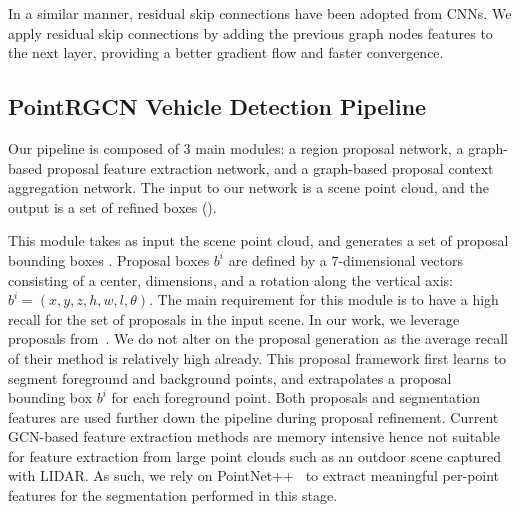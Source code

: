 \documentclass[10pt,twocolumn,letterpaper]{article}
\begin{document}
In a similar manner, residual skip connections have been adopted from CNNs.
We apply residual skip connections by adding the previous graph nodes features to the next layer, providing a better gradient flow and faster convergence.






\subsection{PointRGCN Vehicle Detection Pipeline}
Our pipeline is composed of $3$ main modules: a region proposal network, a graph-based proposal feature extraction network, and a graph-based proposal context aggregation network.
The input to our network is a scene point cloud, and the output is a set of refined boxes \Rc ().

This module takes as input the scene point cloud, and generates a set of proposal bounding boxes \Bc.
Proposal boxes $b^i$ are defined by a $7$-dimensional vectors consisting of a center, dimensions, and a rotation along the vertical axis: $b^i = (x, y, z, h, w, l, \theta)$.
The main requirement for this module is to have a high recall for the set of proposals \Bc in the input scene.
In our work, we leverage proposals from~\cite{shi2019pointrcnn}.
We do not alter on the proposal generation as the average recall of their method is relatively high already.
This proposal framework first learns to segment foreground and background points, and extrapolates a proposal bounding box $b^i$ for each foreground point.
Both proposals and segmentation features are used further down the pipeline during proposal refinement.
Current GCN-based feature extraction methods are memory intensive hence not suitable for feature extraction from large point clouds such as an outdoor scene captured with LIDAR.
As such, we rely on PointNet++~\cite{qi2017pointnet++} to extract meaningful per-point features for the segmentation performed in this stage.
\end{document}
